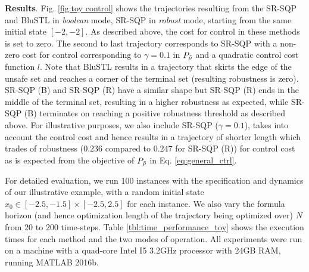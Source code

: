\textbf{Results}.
Fig. \ref{fig:toy control} shows the trajectories resulting from the SR-SQP and BluSTL in \textit{boolean} mode, SR-SQP in \textit{robust} mode, starting from the same initial state $[-2,-2]$. As described above, the cost for control in these methods is set to zero. The second to last trajectory corresponds to SR-SQP %
with a non-zero cost for control corresponding to $\gamma=0.1$  in $P_{\tilde{\rho}}$ and a quadratic control cost function $l$. Note that BluSTL results in a trajectory that skirts the edge of the unsafe set and reaches a corner of the terminal set (resulting robustness is zero). SR-SQP (B) and SR-SQP (R) have a similar shape but SR-SQP (R) ends in the middle of the terminal set, resulting in a higher robustness as expected, while SR-SQP (B) terminates on reaching a positive robustness threshold as described above. 
For illustrative purposes, we also include SR-SQP ($\gamma=0.1$), takes into account the control cost and hence results in a trajectory of shorter length which trades of robustness ($0.236$ compared to $0.247$ for SR-SQP (R)) for control cost as is expected from the objective of $P_{\tilde{\rho}}$ in Eq. \ref{eq:general_ctrl}. 

For detailed evaluation, we run 100 instances with the specification and dynamics of our illustrative example, with a random initial state $x_0 \in [-2.5,-1.5] \times [-2.5,2.5]$ for each instance. We also vary the formula horizon (and hence optimization length of the trajectory being optimized over) $N$ from $20$ to $200$ time-steps. Table \ref{tbl:time_performance_toy} shows the execution times for each method and the two modes of operation. All experiments were run on a machine with a quad-core Intel I5 3.2GHz processor with 24GB RAM, running MATLAB 2016b.


